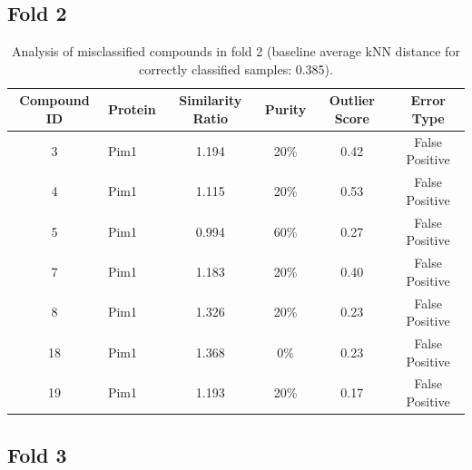 \documentclass{article}
\newenvironment{smarttabular}[1]{%
    \begin{tabular}{#1}%
}{%
    \end{tabular}%
}
\begin{document}
\clearpage

\subsection{Fold 2}

\begin{table}[H]
    \centering
    \small
    \caption{Analysis of misclassified compounds in fold 2 (baseline average kNN distance for correctly classified samples: 0.385).}
    \label{tab:misclassified_compounds_2}
    \begin{smarttabular}{clcccc}
        \toprule
        \textbf{Compound ID} & \textbf{Protein} & \textbf{Similarity Ratio} & \textbf{Purity} & \textbf{Outlier Score} & \textbf{Error Type} \\
        \midrule
        3 & Pim1 & 1.194 & 20\% & 0.42 & False Positive \\
        4 & Pim1 & 1.115 & 20\% & 0.53 & False Positive \\
        5 & Pim1 & 0.994 & 60\% & 0.27 & False Positive \\
        7 & Pim1 & 1.183 & 20\% & 0.40 & False Positive \\
        8 & Pim1 & 1.326 & 20\% & 0.23 & False Positive \\
        18 & Pim1 & 1.368 & 0\% & 0.23 & False Positive \\
        19 & Pim1 & 1.193 & 20\% & 0.17 & False Positive \\
        \bottomrule
    \end{smarttabular}
\end{table}

\clearpage

\subsection{Fold 3}
\end{document}
